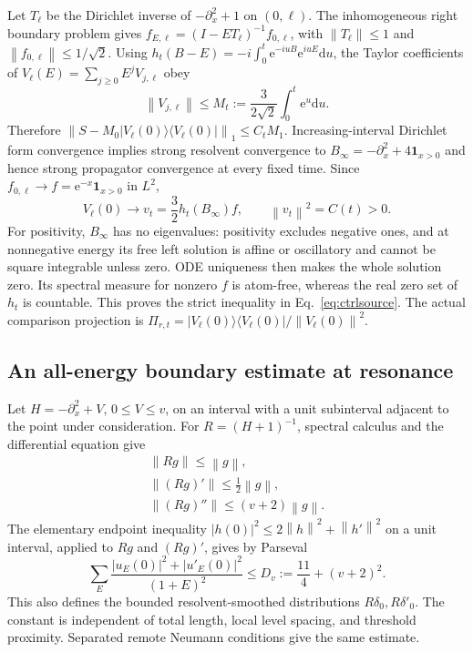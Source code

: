 \documentclass[aps,pra,reprint,superscriptaddress,longbibliography]{revtex4-2}
\newcommand{\dd}{\mathrm d}
\newcommand{\ee}{\mathrm e}
\newcommand{\norm}[1]{\left\lVert#1\right\rVert}
\newcommand{\ket}[1]{\lvert#1\rangle}
\newcommand{\bra}[1]{\langle#1\rvert}
\newcommand{\one}{\mathbf 1}
\begin{document}
Let $T_\ell$ be the Dirichlet inverse of $-\partial_x^2+1$ on
$(0,\ell)$. The inhomogeneous right boundary problem gives
$f_{E,\ell}=(I-ET_\ell)^{-1}f_{0,\ell}$, with
$\norm{T_\ell}\le1$ and $\norm{f_{0,\ell}}\le1/\sqrt2$.
Using $h_t(B-E)=-i\int_0^t\ee^{-iuB}\ee^{iuE}\dd u$, the
Taylor coefficients of $V_\ell(E)=\sum_{j\ge0}E^jV_{j,\ell}$ obey
\begin{equation}
 \norm{V_{j,\ell}}\le M_t:=\frac3{2\sqrt2}\int_0^t\ee^u\dd u.
                                                        \label{eq:ctrltaylor}
\end{equation}
Therefore
$\norm{S-M_0\ket{V_\ell(0)}\bra{V_\ell(0)}}_1\le C_tM_1$.
Increasing-interval Dirichlet form convergence implies strong
resolvent convergence to $B_\infty=-\partial_x^2+4\one_{x>0}$
and hence strong propagator convergence at every fixed time.
Since $f_{0,\ell}\to f=\ee^{-x}\one_{x>0}$ in $L^2$,
\begin{equation}
 V_\ell(0)\longrightarrow v_t=\frac32h_t(B_\infty)f,
 \qquad\norm{v_t}^2=C(t)>0.                              \label{eq:ctrlsource}
\end{equation}
For positivity, $B_\infty$ has no eigenvalues: positivity excludes
negative ones, and at nonnegative energy its free left solution is
affine or oscillatory and cannot be square integrable unless zero.
ODE uniqueness then makes the whole solution zero. Its spectral
measure for nonzero $f$ is atom-free, whereas the real zero set of
$h_t$ is countable. This proves the strict inequality in
Eq.~\eqref{eq:ctrlsource}. The actual comparison projection is
$\Pi_{r,t}=\ket{V_\ell(0)}\bra{V_\ell(0)}/\norm{V_\ell(0)}^2$.

\subsection{An all-energy boundary estimate at resonance}

Let $H=-\partial_x^2+V$, $0\le V\le v$, on an interval with a
unit subinterval adjacent to the point under consideration.
For $R=(H+1)^{-1}$, spectral calculus and the differential equation
give
\begin{equation}
 \begin{gathered}
 \norm{Rg}\le\norm g,\quad\\
 \norm{(Rg)'}\le\tfrac12\norm g,\quad\\
 \norm{(Rg)''}\le(v+2)\norm g.                            \label{eq:ctrlres}
 \end{gathered}
\end{equation}
The elementary endpoint inequality
$|h(0)|^2\le2\norm h^2+\norm{h'}^2$ on a unit interval,
applied to $Rg$ and $(Rg)'$, gives by Parseval
\begin{equation}
 \sum_E\frac{|u_E(0)|^2+|u'_E(0)|^2}{(1+E)^2}
 \le D_v:=\frac{11}4+(v+2)^2.                            \label{eq:ctrltrace}
\end{equation}
This also defines the bounded resolvent-smoothed distributions
$R\delta_0,R\delta'_0$. The constant is independent of total
length, local level spacing, and threshold proximity. Separated
remote Neumann conditions give the same estimate.
\end{document}
